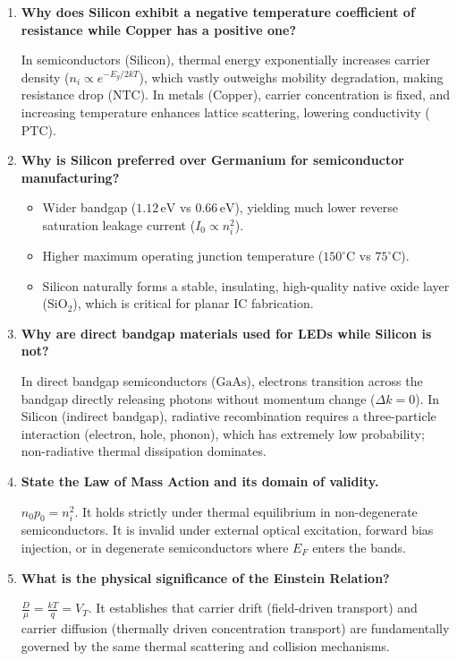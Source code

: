 \documentclass[12pt,a4paper]{article}
\newcommand{\Q}[1]{\textbf{#1}\par\noindent\ignorespaces}
\begin{document}
\begin{tcolorbox}[exambox, title={\textbf{Frequently Asked / Viva Questions}}]
\begin{enumerate}[topsep=0pt, label=\textbf{Q\arabic*.}, itemsep=5pt]
  \item \Q{Why does Silicon exhibit a negative temperature coefficient of resistance while Copper has a positive one?}
    In semiconductors (Silicon), thermal energy exponentially increases carrier density ($n_i \propto e^{-E_g/2kT}$), which vastly outweighs mobility degradation, making resistance drop ($\text{NTC}$). In metals (Copper), carrier concentration is fixed, and increasing temperature enhances lattice scattering, lowering conductivity ($\text{PTC}$).
  \item \Q{Why is Silicon preferred over Germanium for semiconductor manufacturing?}
    \begin{itemize}[leftmargin=*, itemsep=1pt, topsep=2pt]
      \item Wider bandgap ($1.12\,\text{eV}$ vs $0.66\,\text{eV}$), yielding much lower reverse saturation leakage current ($I_0 \propto n_i^2$).
      \item Higher maximum operating junction temperature ($150^\circ\text{C}$ vs $75^\circ\text{C}$).
      \item Silicon naturally forms a stable, insulating, high-quality native oxide layer ($\text{SiO}_2$), which is critical for planar IC fabrication.
    \end{itemize}
  \item \Q{Why are direct bandgap materials used for LEDs while Silicon is not?}
    In direct bandgap semiconductors ($\text{GaAs}$), electrons transition across the bandgap directly releasing photons without momentum change ($\Delta k = 0$). In Silicon (indirect bandgap), radiative recombination requires a three-particle interaction (electron, hole, phonon), which has extremely low probability; non-radiative thermal dissipation dominates.
  \item \Q{State the Law of Mass Action and its domain of validity.}
    $n_0 p_0 = n_i^2$. It holds strictly under thermal equilibrium in non-degenerate semiconductors. It is invalid under external optical excitation, forward bias injection, or in degenerate semiconductors where $E_F$ enters the bands.
  \item \Q{What is the physical significance of the Einstein Relation?}
    $\frac{D}{\mu} = \frac{kT}{q} = V_T$. It establishes that carrier drift (field-driven transport) and carrier diffusion (thermally driven concentration transport) are fundamentally governed by the same thermal scattering and collision mechanisms.

\end{enumerate}
\end{tcolorbox}
\end{document}
